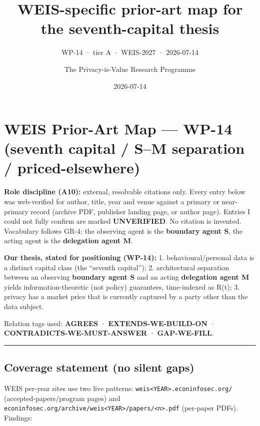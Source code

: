\documentclass[
  11pt,
]{article}
\title{WEIS-specific prior-art map for the seventh-capital thesis}
\subtitle{WP-14 · tier A · WEIS-2027 · 2026-07-14}
\author{The Privacy-is-Value Research Programme}
\date{2026-07-14}
\begin{document}
\maketitle

\section{WEIS Prior-Art Map --- WP-14 (seventh capital / S--M separation
/
priced-elsewhere)}\label{weis-prior-art-map-wp-14-seventh-capital-sm-separation-priced-elsewhere}

\textbf{Role discipline (A10):} external, resolvable citations only.
Every entry below was web-verified for author, title, year and venue
against a primary or near-primary record (archive PDF, publisher landing
page, or author page). Entries I could not fully confirm are marked
\textbf{UNVERIFIED}. No citation is invented. Vocabulary follows GR-4:
the observing agent is the \textbf{boundary agent S}, the acting agent
is the \textbf{delegation agent M}.

\textbf{Our thesis, stated for positioning (WP-14):} 1.
behavioural/personal data is a distinct capital class (the ``seventh
capital''); 2. architectural separation between an observing
\textbf{boundary agent S} and an acting \textbf{delegation agent M}
yields information-theoretic (not policy) guarantees, time-indexed as
R(t); 3. privacy has a market price that is currently captured by a
party other than the data subject.

Relation tags used: \textbf{AGREES} · \textbf{EXTENDS-WE-BUILD-ON} ·
\textbf{CONTRADICTS-WE-MUST-ANSWER} · \textbf{GAP-WE-FILL}.

\begin{center}\rule{0.5\linewidth}{0.5pt}\end{center}

\subsection{Coverage statement (no silent
gaps)}\label{coverage-statement-no-silent-gaps}

WEIS per-year sites use two live patterns:
\texttt{weis\textless{}YEAR\textgreater{}.econinfosec.org/}
(accepted-papers/program pages) and
\texttt{econinfosec.org/archive/weis\textless{}YEAR\textgreater{}/papers/\textless{}n\textgreater{}.pdf}
(per-paper PDFs). Findings:
\end{document}
